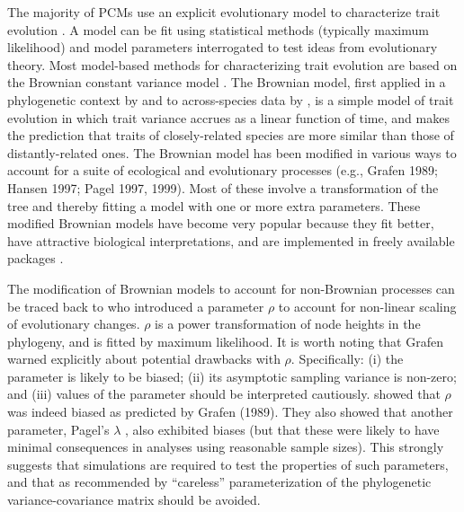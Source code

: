 \documentclass[a4paper,12pt]{article}
\begin{document}
The majority of PCMs use an explicit evolutionary model to characterize trait evolution \citep{Freckleton:2011aa}. A model can be fit using statistical methods (typically maximum likelihood) and model parameters interrogated to test ideas from evolutionary theory. Most model-based methods for characterizing trait evolution are based on the Brownian constant variance model \citep[for exceptions see][]{price1997correlated,harvey2000comparative,freckleton2006detecting}. The Brownian model, first applied in a phylogenetic context by \citet{cavalli1967} and to across-species data by \citet{felsenstein1973maximum}, is a simple model of trait evolution in which trait variance accrues as a linear function of time, and makes the prediction that traits of closely-related species are more similar than those of distantly-related ones. The Brownian model has been modified in various ways to account for a suite of ecological and evolutionary processes (e.g., Grafen 1989; Hansen 1997; Pagel 1997, 1999). Most of these involve a transformation of the tree and thereby fitting a model with one or more extra parameters. These modified Brownian models have become very popular because they fit better, have attractive biological interpretations, and are implemented in freely available packages \citep[e.g., R;][]{R-Core-Team:2014aa}. 

The modification of Brownian models to account for non-Brownian processes can be traced back to \citet{grafen1989phylogenetic} who introduced a parameter $\rho$ to account for non-linear scaling of evolutionary changes. $\rho$ is a power transformation of node heights in the phylogeny, and is fitted by maximum likelihood. It is worth noting that Grafen warned explicitly about potential drawbacks with $\rho$. Specifically: (i) the parameter is likely to be biased; (ii) its asymptotic sampling variance is non-zero; and (iii) values of the parameter should be interpreted cautiously. \citet{freckleton2002phylogenetic} showed that $\rho$ was indeed biased as predicted by Grafen (1989). They also showed that another parameter, Pagel’s $\lambda$ \citep{Pagel:1997aa,Pagel:1999aa}, also exhibited biases (but that these were likely to have minimal consequences in analyses using reasonable sample sizes). This strongly suggests that simulations are required to test the properties of such parameters, and that as recommended by \citet{grafen1989phylogenetic} “careless” parameterization of the phylogenetic variance-covariance matrix should be avoided.
\end{document}
